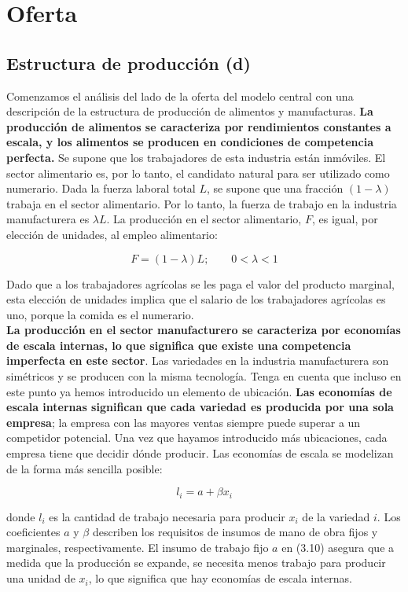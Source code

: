 \section{Oferta}

\subsection{Estructura de producción (d)}
Comenzamos el análisis del lado de la oferta del modelo central con una descripción de la estructura de producción de alimentos y manufacturas. \textbf{La producción de alimentos se caracteriza por rendimientos constantes a escala, y los alimentos se producen en condiciones de competencia perfecta.} Se supone que los trabajadores de esta industria están inmóviles. El sector alimentario es, por lo tanto, el candidato natural para ser utilizado como numerario. Dada la fuerza laboral total $L$, se supone que una fracción $(1-\lambda)$ trabaja en el sector alimentario. Por lo tanto, la fuerza de trabajo en la industria manufacturera es $\lambda L$. La producción en el sector alimentario, $F$, es igual, por elección de unidades, al empleo alimentario:

\begin{equation}
    F=(1-\lambda)L;\qquad 0<\lambda<1
\end{equation}

Dado que a los trabajadores agrícolas se les paga el valor del producto marginal, esta elección de unidades implica que el salario de los trabajadores agrícolas es uno, porque la comida es el numerario.\\
\textbf{La producción en el sector manufacturero se caracteriza por economías de escala internas, lo que significa que existe una competencia imperfecta en este sector}. Las variedades en la industria manufacturera son simétricos y se producen con la misma tecnología. Tenga en cuenta que incluso en este punto ya hemos introducido un elemento de ubicación. \textbf{Las economías de escala internas significan que cada variedad es producida por una sola empresa}; la empresa con las mayores ventas siempre puede superar a un competidor potencial. Una vez que hayamos introducido más ubicaciones, cada empresa tiene que decidir dónde producir. Las economías de escala se modelizan de la forma más sencilla posible:

\begin{equation}
    l_i = a + \beta x_i
\end{equation}

donde $l_i$ es la cantidad de trabajo necesaria para producir $x_i$ de la variedad $i$. Los coeficientes $a$ y $\beta$ describen los requisitos de insumos de mano de obra fijos y marginales, respectivamente. El insumo de trabajo fijo $a$ en (3.10) asegura que a medida que la producción se expande, se necesita menos trabajo para producir una unidad de $x_i$, lo que significa que hay economías de escala internas. 

